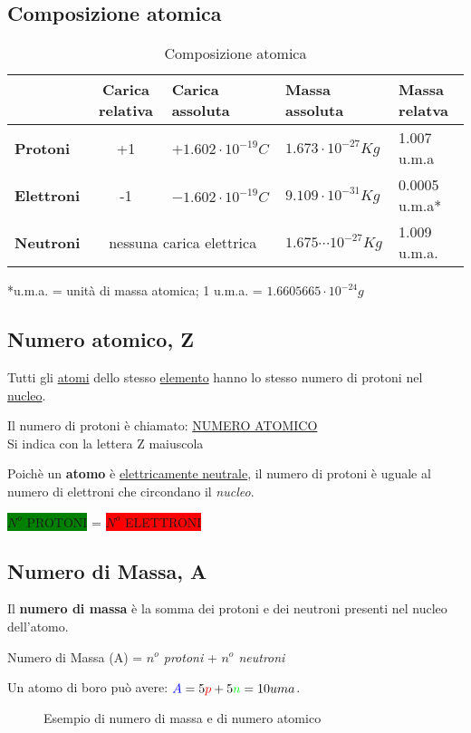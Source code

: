 \documentclass{book}
\begin{document}
\subsection{Composizione atomica}
\label{sec:compatom}
\begin{table}[!ht]
  \centering
  \begin{tabular}{lclll}
    &Carica relativa&Carica assoluta&Massa assoluta & Massa relatva\\\hline
    \textbf{Protoni} & +1 & $+1.602\cdot 10^{-19}C$ & $1.673\cdot 10^{-27}Kg$ & 1.007 u.m.a\\\hline
    \textbf{Elettroni} & -1  & $-1.602\cdot 10^{-19}C$ & $9.109\cdot 10^{-31}Kg$ & 0.0005 u.m.a*\\\hline
    \textbf{Neutroni} & \multicolumn{2}{c}{\color{red}nessuna carica elettrica} & $1.675\cdots10^{-27} Kg$
                                    & 1.009 u.m.a.\\
    \hline
  \end{tabular}
  \caption{Composizione atomica}
  \label{tab:compatom}
\end{table}
*u.m.a. = unità di massa atomica; 1 u.m.a. = $1.6605665\cdot 10^{-24}g$

\subsection{Numero atomico, Z}
\label{sec:numatom}

Tutti gli \underline{\color{red} atomi} dello stesso \underline{\color{blue}elemento} hanno lo stesso numero di
{\color{green} protoni} nel \underline{nucleo}.
\begin{center}
  Il numero di protoni è chiamato: \underline{\color{green}NUMERO ATOMICO}\\
  Si indica con la lettera {\color{green}Z} maiuscola
\end{center}
Poichè un \textbf{atomo} è \underline{elettricamente neutrale}, il numero di {\color{green}protoni} è uguale
al numero di {\color{red}elettroni} che circondano il \textit{nucleo}.
\begin{center}
  \colorbox{green}{$N^o$ PROTONI} = \colorbox{red}{$N^o$ ELETTRONI}
\end{center}

\subsection{Numero di Massa, A}
\label{sec:num.massa,a}

Il \textbf{numero di massa} è la somma dei protoni e dei neutroni presenti nel nucleo dell'atomo.
\begin{center}
  {\color{blue}Numero di Massa (A)} = \textit{\color{red}$n^o$ protoni} + \textit{\color{green}$n^o$ neutroni} 
\end{center}
Un atomo di boro può avere: ${\color{blue}A} = 5{\color{red}p} +5{\color{green}n}=10uma$.
\begin{figure}[ht!]
  \centering
  \resizebox{3.5in}{!}{} 
  \caption{Esempio di numero di massa e di numero atomico}
  \label{fig:es}
\end{figure}
\end{document}
